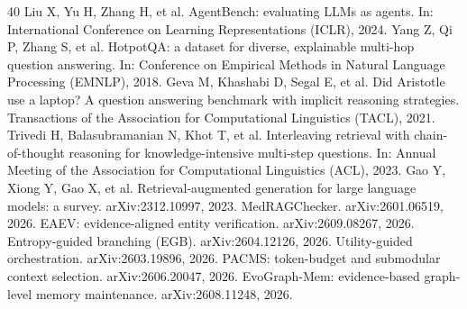 \documentclass[journal,10pt,a4paper]{IEEEtran}
\begin{document}
\begin{thebibliography}{40}
 Liu X, Yu H, Zhang H, et al. AgentBench: evaluating LLMs as agents. In: International Conference on Learning Representations (ICLR), 2024.
 Yang Z, Qi P, Zhang S, et al. HotpotQA: a dataset for diverse, explainable multi-hop question answering. In: Conference on Empirical Methods in Natural Language Processing (EMNLP), 2018.
 Geva M, Khashabi D, Segal E, et al. Did Aristotle use a laptop? A question answering benchmark with implicit reasoning strategies. Transactions of the Association for Computational Linguistics (TACL), 2021.
 Trivedi H, Balasubramanian N, Khot T, et al. Interleaving retrieval with chain-of-thought reasoning for knowledge-intensive multi-step questions. In: Annual Meeting of the Association for Computational Linguistics (ACL), 2023.
 Gao Y, Xiong Y, Gao X, et al. Retrieval-augmented generation for large language models: a survey. arXiv:2312.10997, 2023.
 MedRAGChecker. arXiv:2601.06519, 2026.
 EAEV: evidence-aligned entity verification. arXiv:2609.08267, 2026.
 Entropy-guided branching (EGB). arXiv:2604.12126, 2026.
 Utility-guided orchestration. arXiv:2603.19896, 2026.
 PACMS: token-budget and submodular context selection. arXiv:2606.20047, 2026.
 EvoGraph-Mem: evidence-based graph-level memory maintenance. arXiv:2608.11248, 2026.
\end{thebibliography}
\end{document}
